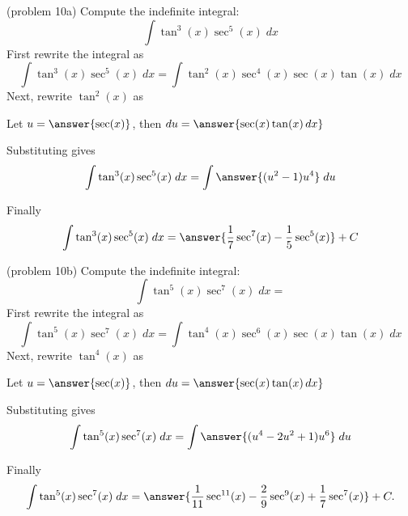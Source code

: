 \documentclass{ximera}
\begin{document}
\begin{problem}(problem 10a)
Compute the indefinite integral:
\[
\int \tan^3(x) \sec^5(x)\;dx
\]
First rewrite the integral as
\[
\int \tan^3(x) \sec^5(x)\;dx = \int \tan^2(x) \sec^4(x) \sec(x) \tan(x) \; dx
\]
Next, rewrite $\tan^2(x)$ as
\begin{multipleChoice}
\end{multipleChoice}

Let $u = \answer{\sec(x)}$, then \; $du = \answer{\sec(x) \tan(x) \, dx}$

Substituting gives
\[
\int \tan^3(x) \sec^5(x)\;dx = \int \answer{(u^2 - 1)u^4} \; du
\]

Finally
\[
\int \tan^3(x) \sec^5(x)\;dx = \answer{\frac17 \sec^7(x) - \frac15 \sec^5(x)} + C
\]
\end{problem}




\begin{problem}(problem 10b)
Compute the indefinite integral:
\[
\int \tan^5(x) \sec^7(x)\;dx = 
\]
First rewrite the integral as
\[
\int \tan^5(x) \sec^7(x)\;dx = \int \tan^4(x) \sec^6(x) \sec(x) \tan(x) \; dx
\]
Next, rewrite $\tan^4(x)$ as
\begin{multipleChoice}
\end{multipleChoice}

Let $u = \answer{\sec(x)}$, then \; $du = \answer{\sec(x) \tan(x) \, dx}$

Substituting gives
\[
\int \tan^5(x) \sec^7(x)\;dx = \int \answer{(u^4 -2u^2 + 1) u^6} \; du
\]

Finally
\[
\int \tan^5(x) \sec^7(x)\;dx =  \answer{\frac{1}{11} \sec^{11}(x) - \frac29 \sec^9(x) + \frac17 \sec^7(x)} + C.
\]
\end{problem}
\end{document}
